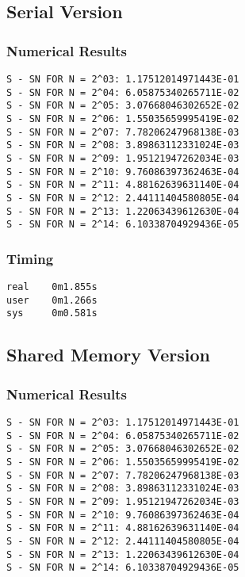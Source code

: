 \documentclass[a4paper, 12pt]{article}
\begin{document}
    \subsection{Serial Version} %
        \subsubsection{Numerical Results} %
            \begin{verbatim}
S - SN FOR N = 2^03: 1.17512014971443E-01
S - SN FOR N = 2^04: 6.05875340265711E-02
S - SN FOR N = 2^05: 3.07668046302652E-02
S - SN FOR N = 2^06: 1.55035659995419E-02
S - SN FOR N = 2^07: 7.78206247968138E-03
S - SN FOR N = 2^08: 3.89863112331024E-03
S - SN FOR N = 2^09: 1.95121947262034E-03
S - SN FOR N = 2^10: 9.76086397362463E-04
S - SN FOR N = 2^11: 4.88162639631140E-04
S - SN FOR N = 2^12: 2.44111404580805E-04
S - SN FOR N = 2^13: 1.22063439612630E-04
S - SN FOR N = 2^14: 6.10338704929436E-05
            \end{verbatim}
        \subsubsection{Timing} %
\begin{verbatim}
real    0m1.855s
user    0m1.266s
sys     0m0.581s
\end{verbatim}        

    \subsection{Shared Memory Version} %
        \subsubsection{Numerical Results} %
        \begin{verbatim}
S - SN FOR N = 2^03: 1.17512014971443E-01
S - SN FOR N = 2^04: 6.05875340265711E-02
S - SN FOR N = 2^05: 3.07668046302652E-02
S - SN FOR N = 2^06: 1.55035659995419E-02
S - SN FOR N = 2^07: 7.78206247968138E-03
S - SN FOR N = 2^08: 3.89863112331024E-03
S - SN FOR N = 2^09: 1.95121947262034E-03
S - SN FOR N = 2^10: 9.76086397362463E-04
S - SN FOR N = 2^11: 4.88162639631140E-04
S - SN FOR N = 2^12: 2.44111404580805E-04
S - SN FOR N = 2^13: 1.22063439612630E-04
S - SN FOR N = 2^14: 6.10338704929436E-05
        \end{verbatim}     
\end{document}
